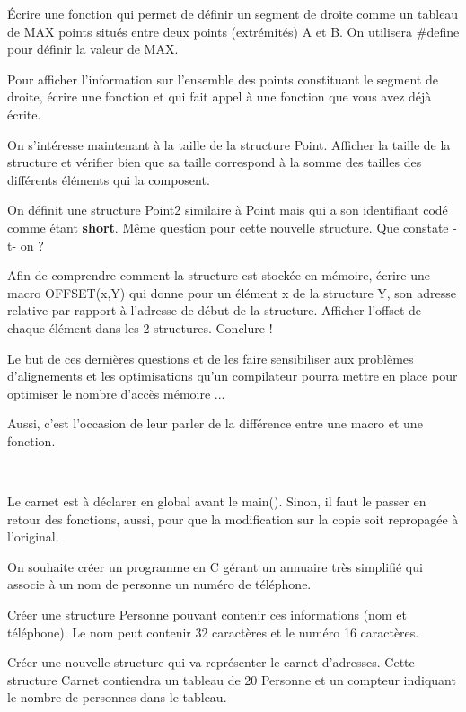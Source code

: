 \documentclass[10pt]{article}\usepackage[correction,nu]{esial}
\begin{document}
\Question Écrire une fonction qui permet de définir un segment de
droite comme un tableau de MAX points situés entre deux points
(extrémités) A et B. On utilisera \#define pour définir la valeur de
MAX.

\Question Pour afficher l'information sur l'ensemble des points
constituant le segment de droite, écrire une fonction
 et qui fait appel à une fonction que
  vous avez déjà écrite.

\Question On s'intéresse maintenant à la taille de la structure
Point. Afficher la taille de la structure et vérifier bien que sa
taille correspond à la somme des tailles des différents éléments qui la
composent.

\Question On définit une structure Point2 similaire à Point mais qui a
son identifiant codé comme étant {\bf short}. Même question pour cette
nouvelle structure. Que constate -t- on ?

\Question Afin de comprendre comment la structure est stockée en
mémoire, écrire une macro OFFSET(x,Y) qui donne pour un élément x de
la structure Y, son adresse relative par rapport à l'adresse de début
de la structure. Afficher l'offset de chaque élément dans les 2
structures. Conclure !

\begin{Reponse}
Le but de ces dernières questions et de les faire sensibiliser aux
problèmes d'alignements et les optimisations qu'un compilateur pourra
mettre en place pour optimiser le nombre d'accès mémoire ...

Aussi, c'est l'occasion de leur parler de la différence entre une
macro et une fonction.
\end{Reponse}

\newpage

\bigskip\bigskip\Exercice
~
\begin{Reponse}
  Le carnet est à déclarer en global avant le main(). Sinon, il faut
  le passer en retour des fonctions, aussi, pour que la modification
  sur la copie soit repropagée à l'original.
\end{Reponse}

On souhaite créer un programme en C gérant un annuaire très simplifié qui
associe à un nom de personne un numéro de téléphone.

\Question Créer une structure Personne pouvant contenir ces informations (nom
et téléphone). Le nom peut contenir 32 caractères et le numéro 16
caractères.

\Question Créer une nouvelle structure qui va représenter le carnet d'adresses.
Cette structure Carnet contiendra un tableau de 20 Personne et un compteur
indiquant le nombre de personnes dans le tableau.
\end{document}
